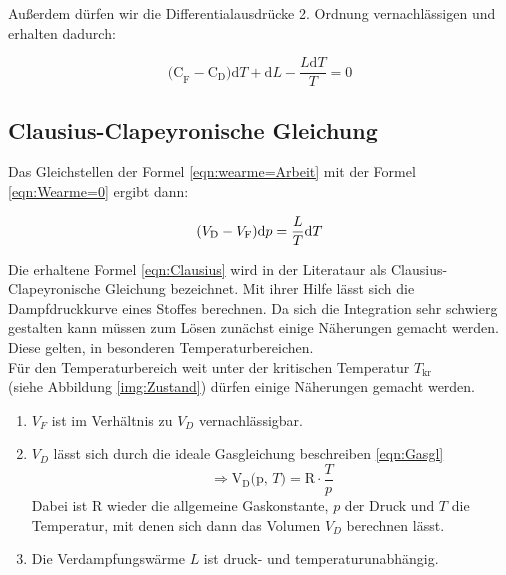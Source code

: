 \noindent Außerdem dürfen wir die Differentialausdrücke 2. Ordnung vernachlässigen und erhalten dadurch:

\begin{equation} 
    \text{(C}_\text{F} - \text{C}_\text{D}\text{)d}T + \text{d}L -\frac{L\text{d}T}{T}= 0
    \label{eqn:Wearme=0}
\end{equation}

\subsection{Clausius-Clapeyronische Gleichung}

\noindent  Das Gleichstellen der Formel \eqref{eqn:wearme=Arbeit} mit der Formel \eqref{eqn:Wearme=0} ergibt dann:

\begin{equation}
    (V_\text{D}-V_\text{F})\text{d}p =\frac{L}{T}\text{d}T\\
    \label{eqn:Clausius}
\end{equation}

\noindent Die erhaltene Formel \eqref{eqn:Clausius} wird in der Literataur als Clausius-Clapeyronische Gleichung bezeichnet. Mit ihrer Hilfe 
lässt sich die Dampfdruckkurve eines Stoffes berechnen. Da sich die Integration sehr schwierg gestalten kann müssen zum Lösen
zunächst einige Näherungen gemacht werden. Diese gelten, in besonderen Temperaturbereichen.\\

\noindent Für den Temperaturbereich weit unter der kritischen Temperatur $T_\text{kr}$ \\ (siehe Abbildung \ref{img:Zustand}) dürfen einige 
Näherungen gemacht werden.
\begin{enumerate}
    \item $V_F$ ist im Verhältnis zu $V_D$ vernachlässigbar.
    \item $V_D$ lässt sich durch die ideale Gasgleichung beschreiben \eqref{eqn:Gasgl}\\
            \begin{equation}
                \Rightarrow \text{V}_\text{D} \text{(p, }T\text{)} = \text{R} \cdot \frac{T}{p} \nonumber
            \end{equation}
        Dabei ist R wieder die allgemeine Gaskonstante, $p$ der Druck und $T$ die Temperatur, mit denen sich dann das Volumen $V_D$ berechnen lässt.
    \item Die Verdampfungswärme $L$ ist druck- und temperaturunabhängig.
\end{enumerate}


